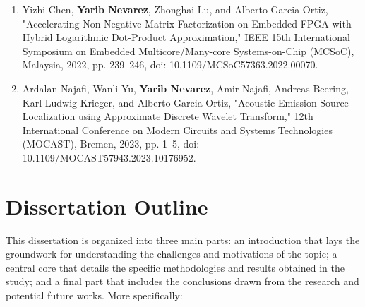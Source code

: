 \begin{enumerate}
	\item Yizhi Chen, \textbf{Yarib Nevarez}, Zhonghai Lu, and Alberto Garcia-Ortiz, "Accelerating Non-Negative Matrix Factorization on Embedded FPGA with Hybrid Logarithmic Dot-Product Approximation," 
	 IEEE 15th International Symposium on Embedded Multicore/Many-core Systems-on-Chip (MCSoC), Malaysia, 2022, pp. 239--246, doi: 10.1109/MCSoC57363.2022.00070.
	
	\item Ardalan Najafi, Wanli Yu, \textbf{Yarib Nevarez}, Amir Najafi, Andreas Beering, Karl-Ludwig Krieger, and Alberto Garcia-Ortiz, "Acoustic Emission Source Localization using Approximate Discrete Wavelet Transform,"  12th International Conference on Modern Circuits and Systems Technologies (MOCAST), Bremen, 2023, pp. 1--5, doi: 10.1109/MOCAST57943.2023.10176952.
	
\end{enumerate}

\section{Dissertation Outline}

This dissertation is organized into three main parts: an introduction that lays the groundwork for understanding the challenges and motivations of the topic; a central core that details the specific methodologies and results obtained in the study; and a final part that includes the conclusions drawn from the research and potential future works. More specifically:

